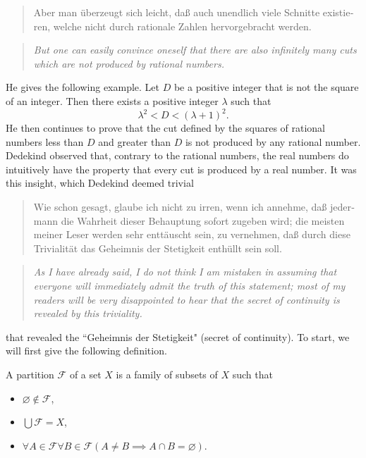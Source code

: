 \documentclass[../main.tex]{subfiles}
\begin{document}
\begin{quote}
    \textgerman{Aber man überzeugt sich leicht, daß auch unendlich viele Schnitte existieren, welche nicht durch rationale Zahlen hervorgebracht werden.}
\end{quote}
\begin{quote}
    \textit{But one can easily convince oneself that there are also infinitely many cuts which are not produced by rational numbers.}
\end{quote}
He gives the following example. Let $D$ be a positive integer that is not the square of an integer. Then there exists a positive integer $\lambda$ such that
\begin{equation*}
    \lambda^2<D<(\lambda+1)^2.
\end{equation*}
He then continues to prove that the cut defined by the squares of rational numbers less than $D$ and greater than $D$ is not produced by any rational number. Dedekind observed that, contrary to the rational numbers, the real numbers do intuitively have the property that every cut is produced by a real number. It was this insight, which Dedekind deemed trivial
\begin{quote}
    \textgerman{Wie schon gesagt, glaube ich nicht zu irren, wenn ich annehme, daß jedermann die Wahrheit dieser Behauptung sofort zugeben wird; die meisten meiner Leser werden sehr enttäuscht sein, zu vernehmen, daß durch diese Trivialität das Geheimnis der Stetigkeit enthüllt sein soll.}
\end{quote}
\begin{quote}
    \textit{As I have already said, I do not think I am mistaken in assuming that everyone will immediately admit the truth of this statement; most of my readers will be very disappointed to hear that the secret of continuity is revealed by this triviality.}
\end{quote}
that revealed the ``\textgerman{Geheimnis der Stetigkeit}" (secret of continuity). To start, we will first give the following definition.
\begin{definition}[Partition]
    A partition $\mathcal{F}$ of a set $X$ is a family of subsets of $X$ such that
    \begin{itemize}
        \item $\varnothing\notin\mathcal{F}$,
        \item $\bigcup\mathcal{F}=X$,
        \item $\forall A\in\mathcal{F}\forall B\in\mathcal{F}(A\neq B\implies A\cap B=\varnothing)$.
    \end{itemize}
\end{definition}
\end{document}
